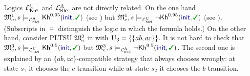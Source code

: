 Logics ${\mathcal{L}^{\mathrm{U}}_{{\mathsf{Kh}}^q}}$ and ${\mathcal{L}^{\mathrm{A}}_{{\mathsf{Kh}}^q}}$ are not directly 
related.
%
On the one hand
$\modelex^1,s \models_\PKhadapt \kh^{0.95}(\init,\goal)$
(see ) but
$\modelex^1,s \models_\PKhunc \neg\kh^{0.95}(\init,\goal)$
(see ). 
%
(Subscripts in $\models$ distinguish the logic in which the formula holds.)
%
On the other hand, consider PLTSU ${\mathfrak{M}}_{\mathrm{e}}^3$ in 
with $\operatorname{U}_3=\{\{ab,ac\}\}$.  It is not hard to check that
$\modelex^3,s \models_\PKhunc \kh^{0.5}(\init,\goal)$ but 
$\modelex^3,s \models_\PKhadapt \neg\kh^{0.5}(\init,\goal)$.
The second one is explained by an $\{ab,ac\}$-compatible strategy that
always chooses wrongly: at state $s_1$ it chooses the $c$ transition
while at state $s_2$ it chooses the $b$ transition.


